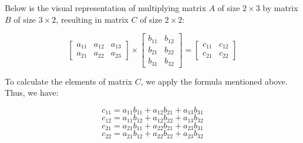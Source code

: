 \documentclass[12pt]{article}
\begin{document}
Below is the visual representation of multiplying matrix \(A\) of size \(2 \times 3\) by matrix \(B\) of size \(3 \times 2\), resulting in matrix \(C\) of size \(2 \times 2\):

\[
\begin{bmatrix}
a_{11} & a_{12} & a_{13} \\
a_{21} & a_{22} & a_{23}
\end{bmatrix}
\times
\begin{bmatrix}
b_{11} & b_{12} \\
b_{21} & b_{22} \\
b_{31} & b_{32}
\end{bmatrix}
=
\begin{bmatrix}
c_{11} & c_{12} \\
c_{21} & c_{22}
\end{bmatrix}
\]

To calculate the elements of matrix \(C\), we apply the formula mentioned above. Thus, we have:

\[
c_{11} = a_{11}b_{11} + a_{12}b_{21} + a_{13}b_{31}
\]
\[
c_{12} = a_{11}b_{12} + a_{12}b_{22} + a_{13}b_{32}
\]
\[
c_{21} = a_{21}b_{11} + a_{22}b_{21} + a_{23}b_{31}
\]
\[
c_{22} = a_{21}b_{12} + a_{22}b_{22} + a_{23}b_{32}
\]
\end{document}
